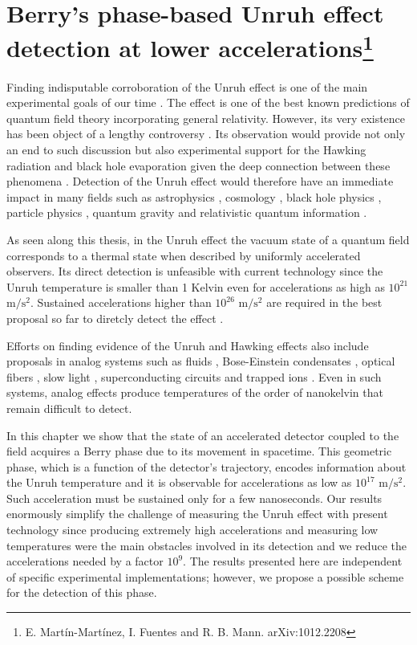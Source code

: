 \chapter{Berry's phase-based Unruh effect detection at lower accelerations\footnote{E. Mart\'in-Mart\'inez, I. Fuentes and R. B. Mann. arXiv:1012.2208}} \label{BerryPh}


Finding indisputable corroboration of the Unruh effect is one of the main experimental goals of our time \cite{experiments,Crispino}. The effect is one of the best known predictions of quantum field theory incorporating general relativity. However, its  very existence has been object of a lengthy controversy  \cite{sceptic}.  Its observation would provide not only an end to such discussion but also experimental support for the Hawking radiation and black hole evaporation given the deep connection between these phenomena \cite{Hawking,Davies}.  Detection of the Unruh effect would therefore have an immediate impact in many fields such as astrophysics \cite{Astronature,Astrophysics}, cosmology \cite{Cosmo}, black hole physics \cite{Bholes}, particle physics \cite{Base}, quantum gravity \cite{Qg} and relativistic quantum information \cite{Alsingtelep,Alicefalls,QI}. 


As seen along this thesis, in the Unruh effect \cite{Unruh0,Crispino} the vacuum state of a quantum field corresponds to a thermal state when described by uniformly accelerated observers. Its direct detection  is unfeasible with current technology since the Unruh temperature is smaller than 1 Kelvin even for accelerations
as high as $10^{21}$ $\text{m}/\text{s}^2$.  Sustained accelerations higher than $10^{26}$ $\text{m}/\text{s}^2$ are required in the best proposal so far  to diretcly detect the effect \cite{ChenTaj,Crispino}.

Efforts on finding evidence of the Unruh and Hawking effects also include proposals in analog systems such as fluids \cite{Unruhan}, Bose-Einstein condensates \cite{garay}, optical fibers \cite{optfib}, slow light \cite{slowlight},  superconducting circuits \cite{supercond} and trapped ions \cite{ions}.  Even in such systems,  analog effects produce temperatures of the order of nanokelvin that remain difficult to detect.

 In this chapter we show that the state of an accelerated detector coupled to the field acquires a Berry phase \cite{Berryoriginal,aharonov} due to its movement in spacetime. This geometric phase, which is a function of the detector's trajectory, encodes information about the Unruh temperature and it is observable for accelerations as low as $10^{17}$ $\text{m}/\text{s}^2$. Such acceleration must be sustained only for a few nanoseconds. Our results enormously simplify the challenge of measuring the Unruh effect with present technology since producing extremely high accelerations and measuring low temperatures were the main obstacles involved in its detection and we reduce the accelerations needed by a factor $10^9$.  The results presented here are independent of specific experimental implementations; however, we propose a possible scheme for the detection of this phase.


